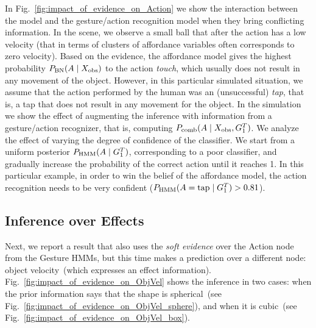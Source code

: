 In Fig.~\ref{fig:impact_of_evidence_on_Action} we show the interaction between the \AffWords{} model and the gesture/action recognition model when they bring conflicting information.
In the scene, we observe a small ball that after the action has a low velocity (that in terms of clusters of affordance variables often corresponds to zero velocity).
Based on the evidence, the affordance model gives the highest probability $P_{\text{BN}}(A \mid X_\text{obs})$ to the action \emph{touch}, which usually does not result in any movement of the object.
However, in this particular simulated situation, we assume that the action performed by the human was an (unsuccessful) \emph{tap}, that is, a tap that does not result in any movement for the object.
In the simulation we show the effect of augmenting the inference with information from a gesture/action recognizer, that is, computing $P_\text{comb}(A \mid X_\text{obs},G_1^T)$.
We analyze the effect of varying the degree of confidence of the classifier.
We start from a uniform posterior $P_{\text{HMM}}(A \mid G_1^T)$, corresponding to a poor classifier, and gradually increase the probability of the correct action until it reaches 1.
In this particular example, in order to win the belief of the affordance model, the action recognition needs to be very confident ($P_{\text{HMM}}(A=\text{tap} \mid G_1^T) > 0.81$).

\subsection{Inference over Effects}
\label{sec:results:inference_effects}

\begin{figure*}
\centering
{} \quad
%
\caption{Predictions about the object velocity of different objects, when given probabilistic soft evidence about the action.}
\label{fig:impact_of_evidence_on_ObjVel}
\end{figure*}

Next, we report a result that also uses the \emph{soft evidence} over the Action node from the Gesture \acp{HMM}, but this time makes a prediction over a different node: object velocity~(which expresses an effect information).
Fig.~\ref{fig:impact_of_evidence_on_ObjVel} shows the inference in two cases: when the prior information says that the shape is spherical~(see Fig.~\ref{fig:impact_of_evidence_on_ObjVel_sphere}), and when it is cubic~(see Fig.~\ref{fig:impact_of_evidence_on_ObjVel_box}).

